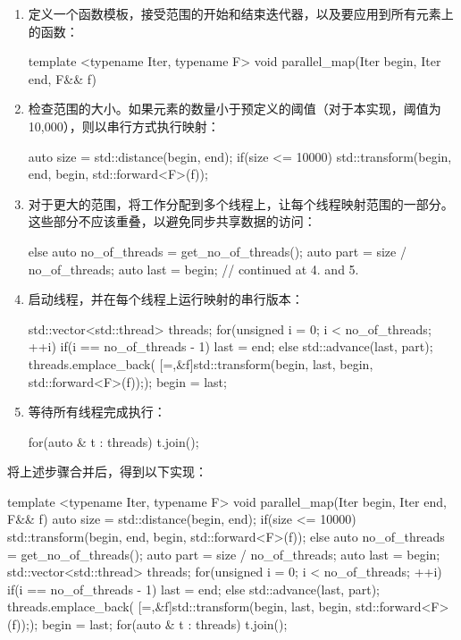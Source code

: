 \begin{enumerate}
\item
定义一个函数模板，接受范围的开始和结束迭代器，以及要应用到所有元素上的函数：

\begin{cpp}
template <typename Iter, typename F>
void parallel_map(Iter begin, Iter end, F&& f)
{
}
\end{cpp}

\item
检查范围的大小。如果元素的数量小于预定义的阈值（对于本实现，阈值为10,000），则以串行方式执行映射：

\begin{cpp}
auto size = std::distance(begin, end);
if(size <= 10000)
    std::transform(begin, end, begin, std::forward<F>(f));
\end{cpp}

\item
对于更大的范围，将工作分配到多个线程上，让每个线程映射范围的一部分。这些部分不应该重叠，以避免同步共享数据的访问：

\begin{cpp}
else
{
    auto no_of_threads = get_no_of_threads();
    auto part = size / no_of_threads;
    auto last = begin;
    // continued at 4. and 5.
}
\end{cpp}

\item
启动线程，并在每个线程上运行映射的串行版本：

\begin{cpp}
std::vector<std::thread> threads;
for(unsigned i = 0; i < no_of_threads; ++i)
{
    if(i == no_of_threads - 1) last = end;
    else std::advance(last, part);
    threads.emplace_back(
        [=,&f]{std::transform(begin, last,
                              begin, std::forward<F>(f));});
    begin = last;
}
\end{cpp}

\item
等待所有线程完成执行：

\begin{cpp}
for(auto & t : threads) t.join();
\end{cpp}
\end{enumerate}

将上述步骤合并后，得到以下实现：

\begin{cpp}
template <typename Iter, typename F>
void parallel_map(Iter begin, Iter end, F&& f)
{
    auto size = std::distance(begin, end);
    if(size <= 10000)
    std::transform(begin, end, begin, std::forward<F>(f));
    else
    {
        auto no_of_threads = get_no_of_threads();
        auto part = size / no_of_threads;
        auto last = begin;
        std::vector<std::thread> threads;
        for(unsigned i = 0; i < no_of_threads; ++i)
        {
            if(i == no_of_threads - 1) last = end;
            else std::advance(last, part);
            threads.emplace_back(
                [=,&f]{std::transform(begin, last,
                                      begin, std::forward<F>(f));});
            begin = last;
        }
        for(auto & t : threads) t.join();
    }
}
\end{cpp}

